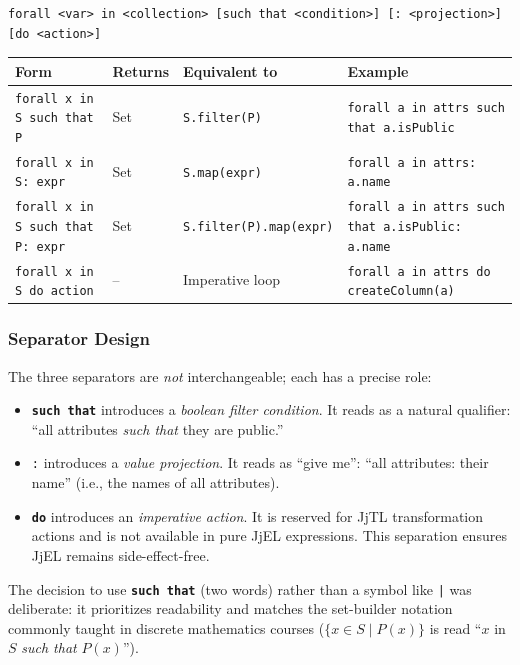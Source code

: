 \documentclass[11pt,a4paper]{article}
\newcommand{\jjel}{\textsf{JjEL}}
\newcommand{\jjtl}{\textsf{JjTL}}
\newcommand{\kw}[1]{\texttt{\textbf{#1}}}
\begin{document}
\begin{lstlisting}[style=jjel,numbers=none]
forall <var> in <collection> [such that <condition>] [: <projection>] [do <action>]
\end{lstlisting}

\begin{center}
\begin{tabular}{@{}llll@{}}
\toprule
\textbf{Form} & \textbf{Returns} & \textbf{Equivalent to} & \textbf{Example} \\
\midrule
\texttt{forall x in S such that P} & Set & \texttt{S.filter(P)} & \texttt{forall a in attrs such that a.isPublic} \\
\texttt{forall x in S: expr} & Set & \texttt{S.map(expr)} & \texttt{forall a in attrs: a.name} \\
\texttt{forall x in S such that P: expr} & Set & \texttt{S.filter(P).map(expr)} & \texttt{forall a in attrs such that a.isPublic: a.name} \\
\texttt{forall x in S do action} & -- & Imperative loop & \texttt{forall a in attrs do createColumn(a)} \\
\bottomrule
\end{tabular}
\end{center}

\subsubsection{Separator Design}

The three separators are \emph{not} interchangeable; each has a precise role:

\begin{itemize}
    \item \kw{such that} introduces a \emph{boolean filter condition}. It reads as a natural qualifier: ``all attributes \emph{such that} they are public.''
    \item \texttt{:} introduces a \emph{value projection}. It reads as ``give me'': ``all attributes: their name'' (i.e., the names of all attributes).
    \item \kw{do} introduces an \emph{imperative action}. It is reserved for \jjtl{} transformation actions and is not available in pure \jjel{} expressions. This separation ensures \jjel{} remains side-effect-free.
\end{itemize}

The decision to use \kw{such that} (two words) rather than a symbol like \texttt{|} was deliberate: it prioritizes readability and matches the set-builder notation commonly taught in discrete mathematics courses ($\{x \in S \mid P(x)\}$ is read ``$x$ in $S$ \emph{such that} $P(x)$'').
\end{document}
